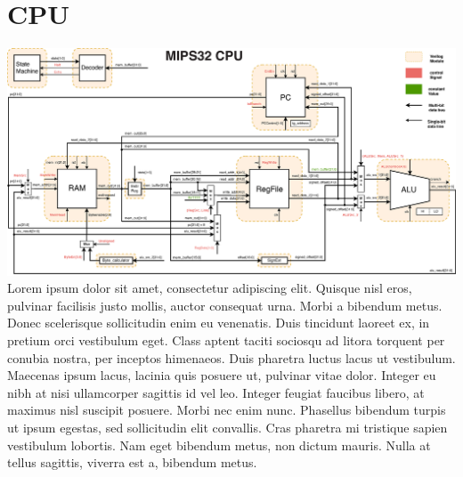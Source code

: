 \section{CPU}

\includegraphics[width=\textwidth]{cpu/mips_cpu.eps}\\[1cm] 

Lorem ipsum dolor sit amet, consectetur adipiscing elit. Quisque nisl eros, 
pulvinar facilisis justo mollis, auctor consequat urna. Morbi a bibendum metus. 
Donec scelerisque sollicitudin enim eu venenatis. Duis tincidunt laoreet ex, 
in pretium orci vestibulum eget. Class aptent taciti sociosqu ad litora torquent
per conubia nostra, per inceptos himenaeos. Duis pharetra luctus lacus ut 
vestibulum. Maecenas ipsum lacus, lacinia quis posuere ut, pulvinar vitae dolor.
Integer eu nibh at nisi ullamcorper sagittis id vel leo. Integer feugiat 
faucibus libero, at maximus nisl suscipit posuere. Morbi nec enim nunc. 
Phasellus bibendum turpis ut ipsum egestas, sed sollicitudin elit convallis. 
Cras pharetra mi tristique sapien vestibulum lobortis. Nam eget bibendum metus, 
non dictum mauris. Nulla at tellus sagittis, viverra est a, bibendum metus.
